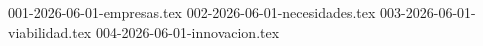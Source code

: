\clearpage
{}
{001-2026-06-01-empresas.tex}
{002-2026-06-01-necesidades.tex}
{003-2026-06-01-viabilidad.tex}
{004-2026-06-01-innovacion.tex}
